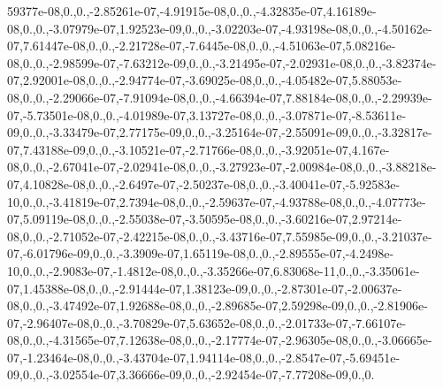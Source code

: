 {\-59377e-\/08,0.,0.,-\/2.\-85261e-\/07,-\/4.\-91915e-\/08,0.,0.,-\/4.\-32835e-\/07,4.\-16189e-\/08,0.,0.,-\/3.\-07979e-\/07,1.\-92523e-\/09,0.,0.,-\/3.\-02203e-\/07,-\/4.\-93198e-\/08,0.,0.,-\/4.\-50162e-\/07,7.\-61447e-\/08,0.,0.,-\/2.\-21728e-\/07,-\/7.\-6445e-\/08,0.,0.,-\/4.\-51063e-\/07,5.\-08216e-\/08,0.,0.,-\/2.\-98599e-\/07,-\/7.\-63212e-\/09,0.,0.,-\/3.\-21495e-\/07,-\/2.\-02931e-\/08,0.,0.,-\/3.\-82374e-\/07,2.\-92001e-\/08,0.,0.,-\/2.\-94774e-\/07,-\/3.\-69025e-\/08,0.,0.,-\/4.\-05482e-\/07,5.\-88053e-\/08,0.,0.,-\/2.\-29066e-\/07,-\/7.\-91094e-\/08,0.,0.,-\/4.\-66394e-\/07,7.\-88184e-\/08,0.,0.,-\/2.\-29939e-\/07,-\/5.\-73501e-\/08,0.,0.,-\/4.\-01989e-\/07,3.\-13727e-\/08,0.,0.,-\/3.\-07871e-\/07,-\/8.\-53611e-\/09,0.,0.,-\/3.\-33479e-\/07,2.\-77175e-\/09,0.,0.,-\/3.\-25164e-\/07,-\/2.\-55091e-\/09,0.,0.,-\/3.\-32817e-\/07,7.\-43188e-\/09,0.,0.,-\/3.\-10521e-\/07,-\/2.\-71766e-\/08,0.,0.,-\/3.\-92051e-\/07,4.\-167e-\/08,0.,0.,-\/2.\-67041e-\/07,-\/2.\-02941e-\/08,0.,0.,-\/3.\-27923e-\/07,-\/2.\-00984e-\/08,0.,0.,-\/3.\-88218e-\/07,4.\-10828e-\/08,0.,0.,-\/2.\-6497e-\/07,-\/2.\-50237e-\/08,0.,0.,-\/3.\-40041e-\/07,-\/5.\-92583e-\/10,0.,0.,-\/3.\-41819e-\/07,2.\-7394e-\/08,0.,0.,-\/2.\-59637e-\/07,-\/4.\-93788e-\/08,0.,0.,-\/4.\-07773e-\/07,5.\-09119e-\/08,0.,0.,-\/2.\-55038e-\/07,-\/3.\-50595e-\/08,0.,0.,-\/3.\-60216e-\/07,2.\-97214e-\/08,0.,0.,-\/2.\-71052e-\/07,-\/2.\-42215e-\/08,0.,0.,-\/3.\-43716e-\/07,7.\-55985e-\/09,0.,0.,-\/3.\-21037e-\/07,-\/6.\-01796e-\/09,0.,0.,-\/3.\-3909e-\/07,1.\-65119e-\/08,0.,0.,-\/2.\-89555e-\/07,-\/4.\-2498e-\/10,0.,0.,-\/2.\-9083e-\/07,-\/1.\-4812e-\/08,0.,0.,-\/3.\-35266e-\/07,6.\-83068e-\/11,0.,0.,-\/3.\-35061e-\/07,1.\-45388e-\/08,0.,0.,-\/2.\-91444e-\/07,1.\-38123e-\/09,0.,0.,-\/2.\-87301e-\/07,-\/2.\-00637e-\/08,0.,0.,-\/3.\-47492e-\/07,1.\-92688e-\/08,0.,0.,-\/2.\-89685e-\/07,2.\-59298e-\/09,0.,0.,-\/2.\-81906e-\/07,-\/2.\-96407e-\/08,0.,0.,-\/3.\-70829e-\/07,5.\-63652e-\/08,0.,0.,-\/2.\-01733e-\/07,-\/7.\-66107e-\/08,0.,0.,-\/4.\-31565e-\/07,7.\-12638e-\/08,0.,0.,-\/2.\-17774e-\/07,-\/2.\-96305e-\/08,0.,0.,-\/3.\-06665e-\/07,-\/1.\-23464e-\/08,0.,0.,-\/3.\-43704e-\/07,1.\-94114e-\/08,0.,0.,-\/2.\-8547e-\/07,-\/5.\-69451e-\/09,0.,0.,-\/3.\-02554e-\/07,3.\-36666e-\/09,0.,0.,-\/2.\-92454e-\/07,-\/7.\-77208e-\/09,0.,0.}
